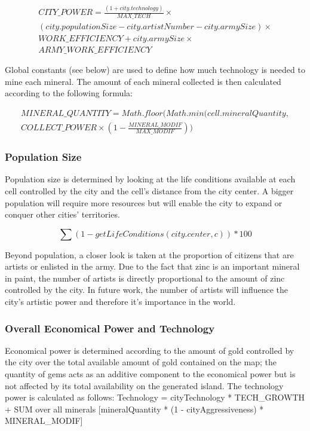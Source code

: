 \begin{equation}
\begin{split}
CITY\_POWER = \frac{(1+city.technology)}{MAX\_TECH} \times \\ (city.populationSize - city.artistNumber - city.armySize) \times \\ WORK\_EFFICIENCY + city.armySize \times \\ARMY\_WORK\_EFFICIENCY
\end{split}
\end{equation}

Global constants (see below) are used to define how much technology is needed to mine each mineral. The amount of each mineral collected is then calculated according to the following formula:

\begin{equation}
\begin{split}
MINERAL\_QUANTITY = Math.floor(Math.min(cell.mineralQuantity, \\ COLLECT\_POWER \times (1 - \frac{MINERAL\_MODIF}{MAX\_MODIF}))
\end{split}
\end{equation}

\subsubsection{Population Size}
Population size is determined by looking at the life conditions available at each cell controlled by the city and the cell's distance from the city center. A bigger population will require more resources but will enable the city to expand or conquer other cities' territories.

\begin{equation}
\sum (1 - getLifeConditions(city.center, c)) * 100
\end{equation}

Beyond population, a closer look is taken at the proportion of citizens that are artists or enlisted in the army. Due to the fact that zinc is an important mineral in paint, the number of artists is directly proportional to the amount of zinc controlled by the city. In future work, the number of artists will influence the city's artistic power and therefore it's importance in the world.

\subsubsection{Overall Economical Power and Technology}
Economical power is determined according to the amount of gold controlled by the city over the total available amount of gold contained on the map; the quantity of gems acts as an additive component to the economical power but is not affected by its total availability on the generated island.
The technology power is calculated as follows:
Technology = cityTechnology * TECH_GROWTH + SUM over all minerals [mineralQuantity * (1 - cityAggressiveness) * MINERAL_MODIF]

